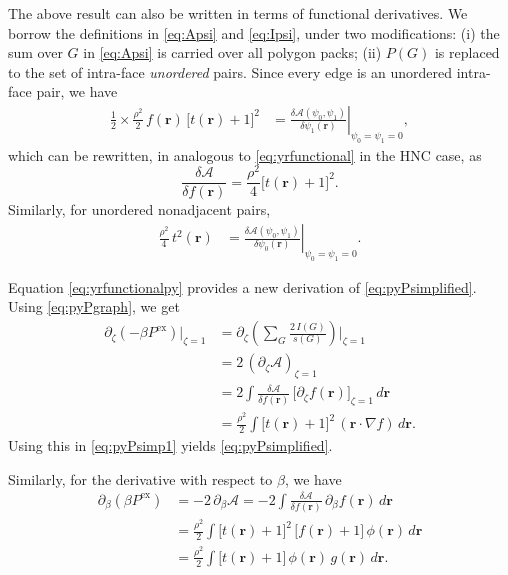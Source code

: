 \documentclass[preprint]{revtex4-1}
\newcommand{\vct}[1]{\mathbf{#1}}
\providecommand{\vr}{} %
\renewcommand{\vr}{\vct{r}}
\newcommand{\supex}[1]{ { { #1 }^{ \mathrm{ex} } } }
\newcommand{\Pex}{\supex{P}}
\newcommand{\A}{\mathcal{A}}
\begin{document}
The above result can also be written
in terms of functional derivatives.
%
We borrow the definitions in
\eqref{eq:Apsi} and \eqref{eq:Ipsi},
under two modifications:
(i) the sum over $G$ in \eqref{eq:Apsi}
is carried over all polygon packs;
(ii) $P(G)$ is replaced to the set of intra-face \emph{unordered} pairs.
%
Since every edge is an unordered intra-face pair,
we have
%
\begin{align*}
\frac 1 2 \times \frac{\rho^2}{2} \, f(\vr) \, \bigl[ t(\vr) + 1 \bigr]^2
&=
\left.
\frac{ \delta \A(\psi_0, \psi_1) } { \delta \psi_1(\vr) }
\right|_{\psi_0 = \psi_1 = 0},
\end{align*}
which can be rewritten,
in analogous to \eqref{eq:yrfunctional} in the HNC case,
as
\begin{equation}
  \frac{ \delta \A } { \delta f(\vr)}
=
  \frac{ \rho^2 } {4}
  \bigl[ t(\vr) + 1 \bigr]^2.
  \label{eq:yrfunctionalpy}
\end{equation}
%
Similarly, for unordered nonadjacent pairs,
\begin{align*}
\frac{\rho^2}{4} \, t^2(\vr)
&=
\left.
\frac{ \delta \A(\psi_0, \psi_1) } { \delta \psi_0(\vr) }
\right|_{\psi_0 = \psi_1 = 0}.
\end{align*}
%


Equation \eqref{eq:yrfunctionalpy} provides a new derivation of \eqref{eq:pyPsimplified}.
%
Using \eqref{eq:pyPgraph}, we get
%
\begin{align*}
  \partial_\zeta (-\beta \Pex) \big|_{\zeta = 1}
&=
  \partial_\zeta \left( \sum_G \frac { 2 \, I(G) } { s(G) } \right) \Bigg|_{\zeta = 1}
\\
&=
  2 \, (\partial_\zeta \A)_{\zeta = 1}
\\
&=
  2 \int \frac{ \delta \A } { \delta f(\vr) } \,
  \big[ \partial_\zeta f(\vr) \big]_{\zeta = 1} \, d\vr
\\
&=
  \frac{\rho^2}{2}
  \int \bigl[ t(\vr) + 1 \bigr]^2 \,
  (\vr \cdot \nabla f) \, d\vr.
\end{align*}
%
Using this in \eqref{eq:pyPsimp1} yields \eqref{eq:pyPsimplified}.

Similarly,
for the derivative with respect to $\beta$, we have
\begin{align*}
  \partial_\beta (\beta \Pex)
&=
  -2 \, \partial_\beta \A
=
  -2 \int \frac{ \delta \A } { \delta f(\vr) } \,
  \partial_\beta f(\vr) \, d\vr
\\
&=
  \frac{\rho^2}{2}
  \int \bigl[ t(\vr) + 1 \bigr]^2 \,
  \big[ f(\vr) + 1 \bigr] \,
  \phi(\vr) \, d\vr
\\
&=
  \frac{\rho^2}{2}
  \int
  \bigl[ t(\vr) + 1 \bigr] \,
  \phi(\vr) \,
  g(\vr) \,
  d\vr.
\end{align*}
%
\end{document}
